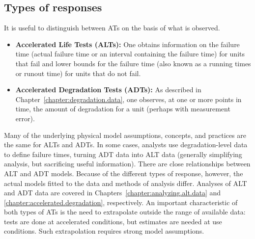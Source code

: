 \subsection{Types of responses}
It is useful to distinguish between ATs on the basis of what is
observed.

\begin{itemize}
\item
{\bf Accelerated Life Tests (ALTs):} One obtains information on the
failure time (actual failure time or an interval containing the
failure time) for units that fail and lower bounds for the failure
time (also known as a running times or runout time) for units that
do not fail.
\item
{\bf Accelerated Degradation Tests (ADTs):} As described in
Chapter~\ref{chapter:degradation.data}, one observes, at one or more
points in time, the amount of degradation for a unit (perhaps with
measurement error).
\end{itemize}
Many of the underlying physical model assumptions, concepts, and
practices are the same for ALTs and ADTs.  In some cases, analysts
use degradation-level data to define failure times, turning ADT data
into ALT data (generally simplifying analysis, but sacrificing
useful information).  There are close relationships between ALT and
ADT models.  Because of the different types of response, however,
the actual models fitted to the data and methods of analysis
differ. Analyses of ALT and ADT data are covered in
Chapters~\ref{chapter:analyzing.alt.data} and
\ref{chapter:accelerated.degradation}, respectively.
An important characteristic of both types of ATs is the need to
extrapolate outside the range of available data: tests are done at
accelerated conditions, but estimates are needed at use conditions.
Such extrapolation requires strong model assumptions.

